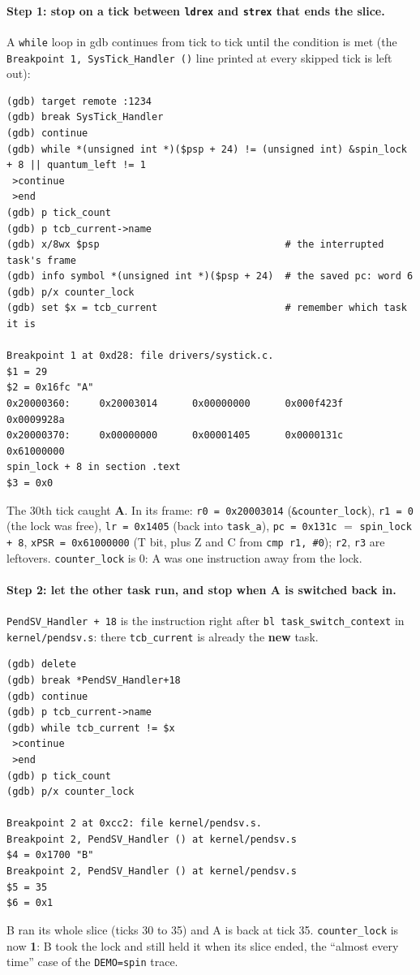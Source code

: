 \paragraph{Step 1: stop on a tick between \texttt{ldrex} and \texttt{strex} that ends the slice.} A \texttt{while} loop in gdb continues from tick to tick until the condition is met (the \texttt{Breakpoint 1, SysTick\_Handler ()} line printed at every skipped tick is left out):
{\verbatimscriptsize
\begin{verbatim}
(gdb) target remote :1234
(gdb) break SysTick_Handler
(gdb) continue
(gdb) while *(unsigned int *)($psp + 24) != (unsigned int) &spin_lock + 8 || quantum_left != 1
 >continue
 >end
(gdb) p tick_count
(gdb) p tcb_current->name
(gdb) x/8wx $psp                                # the interrupted task's frame
(gdb) info symbol *(unsigned int *)($psp + 24)  # the saved pc: word 6
(gdb) p/x counter_lock
(gdb) set $x = tcb_current                      # remember which task it is

Breakpoint 1 at 0xd28: file drivers/systick.c.
$1 = 29
$2 = 0x16fc "A"
0x20000360:     0x20003014      0x00000000      0x000f423f      0x0009928a
0x20000370:     0x00000000      0x00001405      0x0000131c      0x61000000
spin_lock + 8 in section .text
$3 = 0x0
\end{verbatim}}
The 30th tick caught \textbf{A}. In its frame: \texttt{r0 = 0x20003014} (\texttt{\&counter\_lock}), \texttt{r1 = 0} (the lock was free), \texttt{lr = 0x1405} (back into \texttt{task\_a}), \texttt{pc = 0x131c} $=$ \texttt{spin\_lock + 8}, \texttt{xPSR = 0x61000000} (T bit, plus Z and C from \texttt{cmp r1, \#0}); \texttt{r2}, \texttt{r3} are leftovers. \texttt{counter\_lock} is 0: A was one instruction away from the lock.

\paragraph{Step 2: let the other task run, and stop when A is switched back in.} \texttt{PendSV\_Handler + 18} is the instruction right after \texttt{bl task\_switch\_context} in \texttt{kernel/pendsv.s}: there \texttt{tcb\_current} is already the \textbf{new} task.
{\verbatimscriptsize
\begin{verbatim}
(gdb) delete
(gdb) break *PendSV_Handler+18
(gdb) continue
(gdb) p tcb_current->name
(gdb) while tcb_current != $x
 >continue
 >end
(gdb) p tick_count
(gdb) p/x counter_lock

Breakpoint 2 at 0xcc2: file kernel/pendsv.s.
Breakpoint 2, PendSV_Handler () at kernel/pendsv.s
$4 = 0x1700 "B"
Breakpoint 2, PendSV_Handler () at kernel/pendsv.s
$5 = 35
$6 = 0x1
\end{verbatim}}
B ran its whole slice (ticks 30 to 35) and A is back at tick 35. \texttt{counter\_lock} is now \textbf{1}: B took the lock and still held it when its slice ended, the ``almost every time'' case of the \texttt{DEMO=spin} trace.

